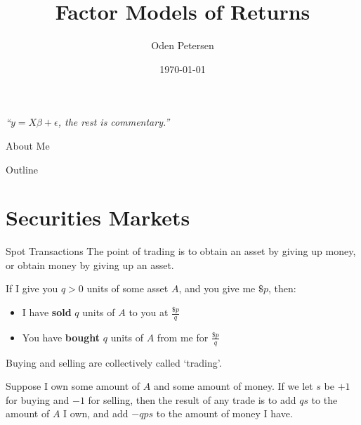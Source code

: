 \documentclass{beamer}
\title[Short Title]{Factor Models of Returns}
\author[Your Name]{Oden Petersen}
\date{\today}
\begin{document}
\begin{frame}
	\titlepage
	\begin{center}
		\textit{``$y=X\beta+\epsilon$, the rest is commentary.''}
	\end{center}
\end{frame}

\begin{frame}{About Me}
\end{frame}

\begin{frame}{Outline}
	\tableofcontents
\end{frame}

\section{Securities Markets}

\begin{frame}{Spot Transactions}
	The point of trading is to obtain an asset by giving up money, or obtain money by giving up an asset.

	If I give you $q>0$ units of some asset $A$, and you give me $\$p$, then:
	\begin{itemize}
		\item I have \textbf{sold} $q$ units of $A$ to you at $\frac{\$p}{q}$
		\item You have \textbf{bought} $q$ units of $A$ from me for $\frac{\$p}{q}$
	\end{itemize} %

	Buying and selling are collectively called `trading'.

	Suppose I own some amount of $A$ and some amount of money. If we let $s$ be $+1$ for buying and $-1$ for selling, then the result of any trade is to add $qs$ to the amount of $A$ I own, and add $-qps$ to the amount of money I have. %

\end{frame}
\end{document}
